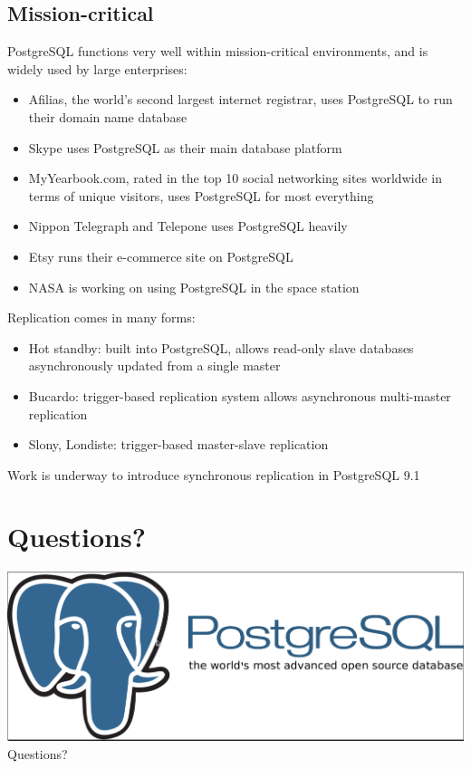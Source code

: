 \documentclass[svgnames]{beamer}
\begin{document}
\subsection{Mission-critical}
\begin{frame}
PostgreSQL functions very well within mission-critical environments, and is widely used by large enterprises:
\begin{itemize}
    \item Afilias, the world's second largest internet registrar, uses PostgreSQL to run their domain name database
    \item Skype uses PostgreSQL as their main database platform
    \item MyYearbook.com, rated in the top 10 social networking sites worldwide in terms of unique visitors, uses PostgreSQL for most everything
    \item Nippon Telegraph and Telepone uses PostgreSQL heavily
    \item Etsy runs their e-commerce site on PostgreSQL
    \item NASA is working on using PostgreSQL in the space station
\end{itemize}
\end{frame}

\begin{frame}
Replication comes in many forms:
\begin{itemize}
    \item Hot standby: built into PostgreSQL, allows read-only slave databases asynchronously updated from a single master
    \item Bucardo: trigger-based replication system allows asynchronous multi-master replication
    \item Slony, Londiste: trigger-based master-slave replication
\end{itemize}
Work is underway to introduce synchronous replication in PostgreSQL 9.1
\end{frame}

\section{Questions?}
\begin{frame}
    \includegraphics[scale=.25]{logo.png}
\\ Questions?
\end{frame}
\end{document}
